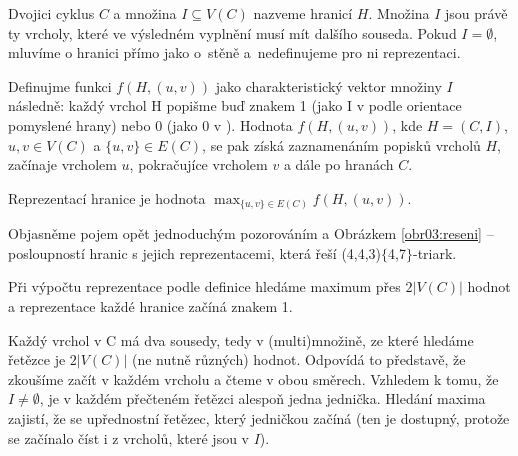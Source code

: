 \begin{definice}\label{def01:1}
Dvojici cyklus $C$ a množina $I \subseteq V(C)$ nazveme hranicí $H$. Množina $I$ jsou právě ty vrcholy, které ve výsledném vyplnění musí mít dalšího souseda. Pokud  $I = \emptyset$, mluvíme o hranici přímo jako o~stěně a~nedefinujeme pro ni reprezentaci.

Definujme funkci $f(H,(u,v))$ jako charakteristický vektor množiny $I$ následně: každý vrchol H popišme buď znakem 1 (jako I v  podle orientace pomyslené hrany) nebo 0 (jako 0 v ). Hodnota $f(H, (u, v))$, kde $H=(C, I)$, $u, v \in V(C)$ a $ \lbrace u, v \rbrace \in E(C)$, se pak získá zaznamenáním popisků vrcholů $H$, začínaje vrcholem $u$, pokračujíce vrcholem $v$ a dále po hranách $C$. 

Reprezentací hranice je hodnota $\max_{\lbrace u, v \rbrace \in E(C)} {f(H,(u,v))}$.
\end{definice}

Objasněme pojem opět jednoduchým pozorováním a Obrázkem \ref{obr03:reseni} -- posloupností hranic s jejich reprezentacemi, která řeší (4,4,3)$\lbrace$4,7$\rbrace$-triark. 


\begin{tvrz}
Při výpočtu reprezentace podle definice hledáme maximum přes $2 |V(C)|$ hodnot a reprezentace každé hranice začíná znakem 1.
\end{tvrz}

\begin{dukaz}
Každý vrchol v C má dva sousedy, tedy v (multi)množině, ze které hledáme řetězce je $2 |V(C)|$ (ne nutně různých) hodnot. Odpovídá to představě, že zkoušíme začít v každém vrcholu a čteme v obou směrech. Vzhledem k tomu, že $I\neq \emptyset$, je v každém přečteném řetězci alespoň jedna jednička. Hledání maxima zajistí, že se upřednostní řetězec, který jedničkou začíná (ten je dostupný, protože se začínalo číst i z vrcholů, které jsou v $I$).  
\end{dukaz}

